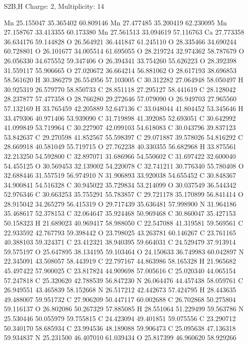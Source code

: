 \documentclass{article}
\begin{document}
S2B,H   Charge: 2, Multiplicity: 14    
   
Mn 25.155047 35.365402 60.809146
Mn 27.477485 35.200419 62.230095
Mn 27.158767 33.413355 60.173380
Mn 27.561513 33.094619 57.116763
Ca 27.773358 36.634176 59.144828
O 26.564921 36.441847 61.245110
O 28.335466 34.690244 60.728801
O 26.101677 34.005514 61.695055
O 28.219724 32.974362 58.787679
O 26.056330 34.675552 59.347406
O 26.394341 33.754260 55.626223
O 28.392398 31.559117 55.906665
O 27.020672 36.664214 56.881062
O 28.617193 38.696853 58.561620
H 30.386279 26.554956 57.103005
C 30.312282 27.064948 58.050497
H 30.925319 26.579770 58.850733
C 28.851118 27.295127 58.441619
C 28.128042 28.237877 57.477358
O 28.766280 29.272646 57.079090
O 26.949703 27.965560 57.132169
H 33.765459 42.205889 52.647136
C 33.048044 41.804452 53.345646
H 33.479306 40.971406 53.939090
C 31.719898 41.392085 52.693051
C 30.642992 41.099849 53.719964
C 30.227907 42.099103 54.618083
C 30.043796 39.837123 53.842637
C 29.270598 41.852567 55.598397
C 29.071887 39.578026 54.816292
C 28.669918 40.581049 55.719715
O 27.762238 40.330355 56.682968
H 33.875561 32.213250 54.592800
C 32.897071 31.686966 54.550602
C 31.697422 32.600040 54.455125
O 30.569453 32.139002 54.220078
C 32.741211 30.776340 55.780408
O 32.688446 31.557519 56.974910
N 31.906893 33.920038 54.655452
C 30.848367 34.900841 54.516328
C 30.945022 35.729834 53.214099
O 30.037549 36.544342 52.976346
C 30.663253 35.755291 55.783857
C 29.721178 35.170899 56.841414
O 28.915042 34.265279 56.415319
O 29.717439 35.636481 57.998900
N 31.964186 35.468617 52.378153
C 32.064647 35.924468 50.969468
C 30.860047 35.427153 50.158323
H 21.689023 40.969417 58.988050
C 22.547088 41.319581 59.569561
C 22.933592 42.767793 59.398442
O 23.798025 43.263781 60.146267
C 23.761165 40.388103 59.324371
C 23.412321 38.940395 59.664031
C 24.529479 37.913914 59.575197
O 25.647895 38.134195 59.103464
O 24.150633 36.749983 60.042897
N 22.345091 43.508057 58.443919
C 22.797167 44.863986 58.165328
H 21.965682 45.497422 57.900025
C 23.817824 44.909698 57.005616
C 25.020340 44.065154 57.247818
C 25.320620 42.788539 56.847230
N 26.064476 44.457438 58.059761
C 26.949551 43.465839 58.152668
N 26.517212 42.442673 57.424795
H 28.443635 49.488007 59.951732
C 27.906209 50.447117 60.002688
C 26.702868 50.275804 59.116137
O 26.802086 50.267329 57.885085
H 28.551064 51.229499 59.563786
N 25.530446 50.055979 59.755815
C 24.423094 49.401851 59.075556
C 23.290712 50.340170 58.685934
C 23.994536 48.189088 59.906473
C 25.095638 47.136318 59.934837
N 25.231500 46.407010 61.039434
O 25.817399 46.960620 58.929266
\end{document}
